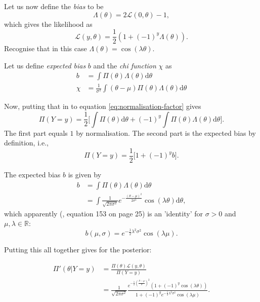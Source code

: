 \documentclass[]{report}
\begin{document}
Let us now define the \textit{bias} to be
\begin{equation}
    \Lambda ( \theta) = 2 \mathcal{L} (0, \theta) - 1,
\end{equation}
which gives the likelihood as
\begin{equation}
    \mathcal{L} (y, \theta) = \frac{1}{2}(1 + (-1)^{y} \Lambda(\theta)).
\end{equation}
Recognise that in this case $\Lambda(\theta) = \cos(\lambda \theta)$.


Let us define \textit{expected bias} $b$ and the \textit{chi function} $\chi$ as
\begin{align}
\label{eq:b}
    b &= \int \Pi(\theta) \Lambda (\theta) \text{d} \theta\\
\label{eq:chi}
    \chi &= \frac{1}{\sigma^2} \int (\theta - \mu)\Pi(\theta) \Lambda (\theta) \text{d} \theta
\end{align}

Now, putting that in to equation \eqref{eq:normalisation-factor} gives
\begin{equation}
    \Pi(Y=y) = \frac{1}{2} \Big[ \int \Pi(\theta) \text{d}\theta + (-1)^y \int \Pi(\theta) \Lambda (\theta) \text{d} \theta \Big].
\end{equation}
The first part equals $1$ by normalisation. The second part is the expected bias by definition, i.e.,
\begin{equation}
     \Pi(Y=y) = \frac{1}{2} \Big[ 1 + (-1)^y b\Big].
\end{equation}

The expected bias $b$ is given by
\begin{align}
    b   &= \int \Pi(\theta) \Lambda (\theta) \text{d} \theta\\
        &= \int \frac{1}{\sqrt{2\pi \sigma^2}} e^{-\frac{(\theta - \mu)^2}{2\sigma^2}} \cos(\lambda \theta) \text{d} \theta,
\end{align}
which apparently (\cite{Koh2020}, equation 153 on page 25) is an 'identity' for $\sigma > 0$ and $\mu, \lambda \in \mathbb{R}$:
\begin{equation}
\label{eq:b-gaussian}
    b(\mu, \sigma) = e^{-\frac{1}{2}\lambda^2\sigma^2} \cos (\lambda \mu).
\end{equation}


Putting this all together gives for the posterior:

\begin{align}
    \Pi'(\theta|Y = y)  &= \frac{\Pi(\theta) \mathcal{L} (y, \theta)}{\Pi(Y=y)}\\
    &= \frac{1}{\sqrt{2\pi \sigma^2}}\frac{e^{-\frac{1}{2}(\frac{\theta - \mu}{\sigma})^2} ( 1 + (-1)^y \cos(\lambda \theta))}{1 + (-1)^y e^{-\frac{1}{2}\lambda^2\sigma^2} \cos (\lambda \mu)}.
\end{align}
\end{document}
